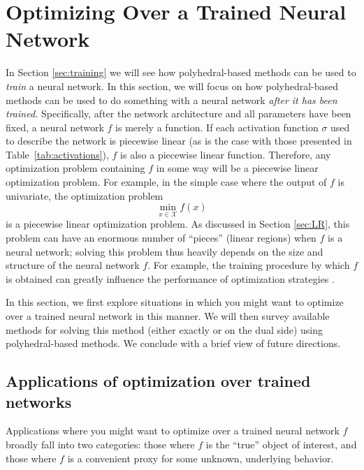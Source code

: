

\section{Optimizing Over a Trained Neural Network}\label{sec:optimizing}
In Section \ref{sec:training} we will see how polyhedral-based methods can be used to \emph{train} a neural network. In this section, we will focus on how polyhedral-based methods can be used to do something with a neural network \emph{after it has been trained.}
Specifically, after the network architecture and all parameters have been fixed, a neural network $f$ is merely a function. If each activation function $\sigma$ used to describe the network is piecewise linear (as is the case with those presented in Table~\ref{tab:activations}), $f$ is also a piecewise linear function. Therefore, any optimization problem containing $f$ in some way will be a piecewise linear optimization problem. For example, in the simple case where the output of $f$ is univariate, the optimization problem 
\[
    \min_{x \in \mathcal{X}} f(x)
\]
is a piecewise linear optimization problem. 
As discussed in Section \ref{sec:LR}, this problem can have an enormous number of ``pieces'' (linear regions) when $f$ is a neural network; solving this problem thus heavily depends on the size and structure of the neural network $f$. For example, the training procedure by which $f$ is obtained can greatly influence the performance of optimization strategies \citep{tjeng2017evaluating,xiao2018training}. 

In this section, we first explore situations in which you might want to optimize over a trained neural network in this manner. We will then survey available methods for solving this method (either exactly or on the dual side) using polyhedral-based methods. 
We conclude with a brief view of future directions. 

\subsection{Applications of optimization over trained networks}
Applications where you might want to optimize over a trained neural network $f$ broadly fall into two categories: those where $f$ is the ``true'' object of interest, and those where $f$ is a convenient proxy for some unknown, underlying behavior.

